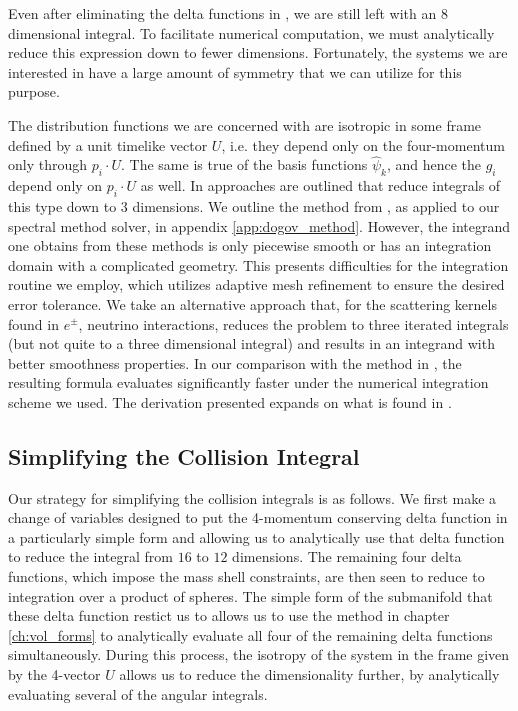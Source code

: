 Even after eliminating the delta functions in , we are still left with an $8$ dimensional integral.  To facilitate numerical computation, we must analytically reduce this expression down to fewer dimensions.  Fortunately, the systems we are interested in have a large amount of symmetry that we can utilize for this purpose.  

The distribution functions we are concerned with are isotropic in some frame defined  by a unit timelike vector $U$, i.e. they depend only on the four-momentum only through $p_i\cdot U$.  The same is true of the basis functions $\hat\psi_k$, and hence the  $g_i$ depend only on $p_i\cdot U$ as well.  In \cite{Madsen,Dolgov_Hansen} approaches are outlined that reduce integrals of this type down to $3$ dimensions.  We outline the method from \cite{Dolgov_Hansen}, as applied to our spectral method solver, in appendix \ref{app:dogov_method}.  However, the integrand one obtains from these methods is only piecewise smooth or has an integration domain with a complicated geometry.  This presents difficulties for the integration routine we employ, which utilizes adaptive mesh refinement to ensure the desired error tolerance.  We take an alternative approach that, for the scattering kernels found in $e^\pm$, neutrino interactions, reduces the problem to three iterated integrals (but not quite to a three dimensional integral) and results in an integrand with better smoothness properties.  In our comparison with the method in \cite{Dolgov_Hansen}, the resulting formula evaluates significantly faster under the numerical integration scheme we used.   The derivation presented expands on what is found in \cite{letessier2002hadrons}.

\subsection{Simplifying the Collision Integral}\label{coll_simp_sec}
Our strategy for simplifying the collision integrals is as follows.  We first make a change of variables designed to put the 4-momentum conserving delta function in a particularly simple form and allowing us to analytically use that delta function to reduce the integral from $16$ to $12$ dimensions.  The remaining four delta functions, which impose the mass shell constraints, are then seen to reduce to integration over a product of spheres.  The simple form of the submanifold that these delta function restict us to allows us to use the method in chapter \ref{ch:vol_forms} to analytically evaluate all four of the remaining delta functions simultaneously.  During this process, the isotropy of the system in the frame given by the 4-vector $U$ allows us to reduce the dimensionality further, by analytically evaluating several of the angular integrals. 

